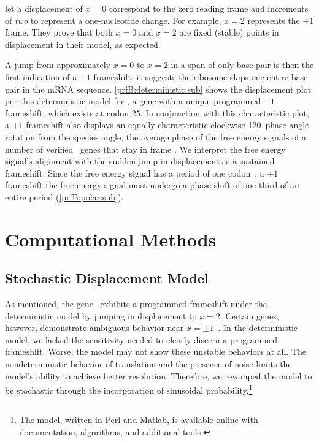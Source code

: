 \documentclass[12pt]{article}
\begin{document}
\citeauthor{lalit:mechanics} let a displacement of $x = 0$ correspond
to the zero reading frame and increments of \emph{two} to represent a
one-nucleotide change. For example, $x =2$ represents the +1 frame.
They prove that both $x = 0$ and $x = 2$ are fixed
(stable) points in displacement in their model, as expected.

A jump from approximately $x = 0$ to $x = 2$ in a span of only
base pair is then the first indication of a $+1$ frameshift; it
suggests the ribosome skips one entire base pair in the mRNA sequence.
\autoref{prfB:deterministic:sub} shows the displacement plot per this
deterministic model for \prfB, a gene with a unique programmed $+1$
frameshift, which exists at codon 25. In conjunction with this
characteristic plot, a $+1$ frameshift also displays an equally
characteristic clockwise 120\degree\ phase angle rotation from the
species angle, the average phase of the free energy signals of a
number of verified \ecoli\ genes that stay in frame
\cite{lalit:mechanics}.  We interpret the free energy signal's
alignment with the sudden jump in displacement as a sustained
frameshift. Since the free energy signal has a period of one
codon~\cite{lalit:mechanics}, a $+1$ frameshift the free energy signal
must undergo a phase shift of one-third of an entire period
(\autoref{prfB:polar:sub}).

\section{Computational Methods}

\subsection{Stochastic Displacement Model}
\label{stochastic}

As mentioned, the gene \prfB\ exhibits a programmed frameshift under
the deterministic model by jumping in displacement to $x=2$.  Certain
genes, however, demonstrate ambiguous behavior near
$x = \pm 1$~\cite{lalit:mechanics}.  In the deterministic model, we lacked the
sensitivity needed to clearly discern a programmed
frameshift. Worse, the model may not show these unstable
behaviors at all. The nondeterministic
behavior of translation and the presence of noise limits the model's
ability to achieve better resolution. Therefore, we revamped the model to be
stochastic through the incorporation of sinusoidal probability.\footnote{
  The model, written in Perl and Matlab, is available online with
  documentation, algorithms, and additional tools.
}
\end{document}
